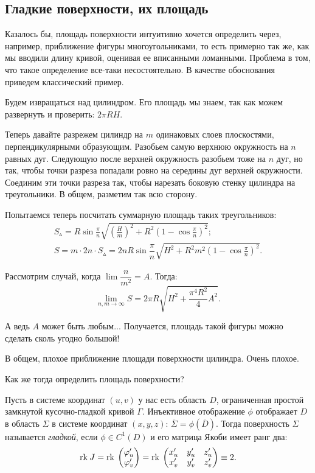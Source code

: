 \subsection{Гладкие поверхности, их площадь}
Казалось бы, площадь поверхности интуитивно хочется определить через, например, приближение фигуры многоугольниками, то есть примерно так же, как мы вводили длину кривой, оценивая ее вписанными ломанными. Проблема в том, что такое определение все-таки несостоятельно. В качестве обоснования приведем классический пример.

\begin{Examples}
Будем извращаться над цилиндром. Его площадь мы знаем, так как можем развернуть и проверить: $2\pi R H$.

Теперь давайте разрежем цилиндр на $m$ одинаковых слоев плоскостями, перпендикулярными образующим. Разобьем самую верхнюю окружность на $n$ равных дуг. Следующую после верхней окружность разобьем тоже на $n$ дуг, но так, чтобы точки
разреза попадали ровно на середины дуг верхней окружности. Соединим эти точки разреза так, чтобы нарезать боковую стенку цилиндра на треугольники. В общем, разметим так всю сторону.

Попытаемся теперь посчитать суммарную площадь таких треугольников:
\begin{gather*}
S_\vartriangle = R \sin \frac{\pi}{n} \sqrt{\left( \frac{H}{m} \right)^2 + R^2 \left( 1 - \cos \frac{\pi}{n} \right)^2};\\
S =  m \cdot 2n \cdot S_\vartriangle = 2n R \sin \dfrac{\pi}{n}\sqrt{H^2 + R^2m^2 \left( 1 - \cos \frac{\pi}{n} \right)^2}.
\end{gather*}

Рассмотрим случай, когда $\lim \dfrac{n}{m^2} = A$. Тогда:
$$
\lim\limits_{n, m \to \infty} S = 2\pi R \sqrt{H^2 + \dfrac{\pi^4 R^2}{4}A^2}.
$$

А ведь $A$ может быть любым... Получается, площадь такой фигуры можно сделать сколь угодно большой!

В общем, плохое приближение площади поверхности цилиндра. Очень плохое.
\end{Examples}

Как же тогда определить площадь поверхности?

\begin{Def}
Пусть в системе координат $(u, v)$ у нас есть область $D$, ограниченная простой замкнутой кусочно-гладкой кривой $\Gamma$. Инъективное отображение $\phi$ отображает $D$ в область $\Sigma$ в системе координат $(x, y, z)$: $\overline\Sigma = \phi(\overline D)$. Тогда поверхность $\Sigma$ называется \textit{гладкой}, если  $\phi \in C^1(D)$ и его матрица Якоби имеет ранг два:
$$
\mathrm{rk}\: J = \mathrm{rk}\: \begin{pmatrix}
\varphi'_u \\ \varphi'_v
\end{pmatrix} = \mathrm{rk}\: \begin{pmatrix}
x'_u & y'_u & z'_u \\
x'_v & y'_v & z'_v
\end{pmatrix} \equiv 2.
$$
\end{Def}

